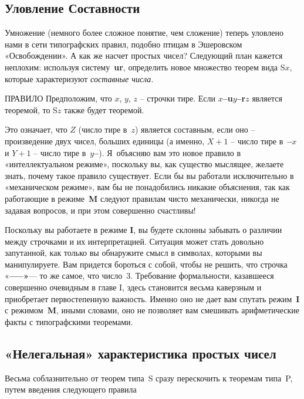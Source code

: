 \documentclass[../main.tex]{subfiles}
\begin{document}
\subsection{Уловление Составности}

Умножение (немного более сложное понятие, чем сложение) теперь уловлено нами в сети типографских правил, подобно птицам в Эшеровском «Освобождении».
А как же насчет простых чисел?
Следующий план кажется неплохим: используя систему~\textbf{ur}, определить новое множество теорем вида S$x$, которые характеризуют \emph{составные числа}.

\begin{mybox}{ПРАВИЛО}
    Предположим, что $x$, $y$, $z$ \--- строчки тире.
    Если \textbf{$x$--u$y$--r$z$} является теоремой, то S$z$ также будет теоремой.
\end{mybox}

Это означает, что $Z$ (число тире в~$z$) является составным, если оно \--- произведение двух чисел, больших единицы (а именно, $X + 1$ \--- число тире в~\textbf{--$x$} и $Y + 1$ \--- число тире в~\textbf{$y$--}).
Я~объясняю вам это новое правило в «интеллектуальном режиме», поскольку вы, как существо мыслящее, желаете знать, почему такое правило существует.
Если бы вы работали исключительно в «механическом режиме», вам бы не понадобились никакие объяснения, так как работающие в режиме~\textbf{M} следуют правилам чисто механически, никогда не задавая вопросов, и при этом совершенно счастливы!

Поскольку вы работаете в режиме \textbf{I}, вы будете склонны забывать о различии между строчками и их интерпретацией. Ситуация может стать довольно запутанной, как только вы обнаружите смысл в символах, которыми вы манипулируете.
Вам придется бороться с собой, чтобы не решить, что строчка «\textbf{--{}--{}--»}--- то же самое, что число~3.
Требование формальности, казавшееся совершенно очевидным в главе I, здесь становится весьма каверзным и приобретает первостепенную важность.
Именно оно не дает вам спутать режим~\textbf{I} с режимом~\textbf{M}, иными словами, оно не позволяет вам смешивать арифметические факты с типографскими теоремами.


\subsection{«Нелегальная» характеристика простых чисел}

Весьма соблазнительно от теорем типа~S сразу перескочить к теоремам типа~P, путем введения следующего правила
\end{document}
